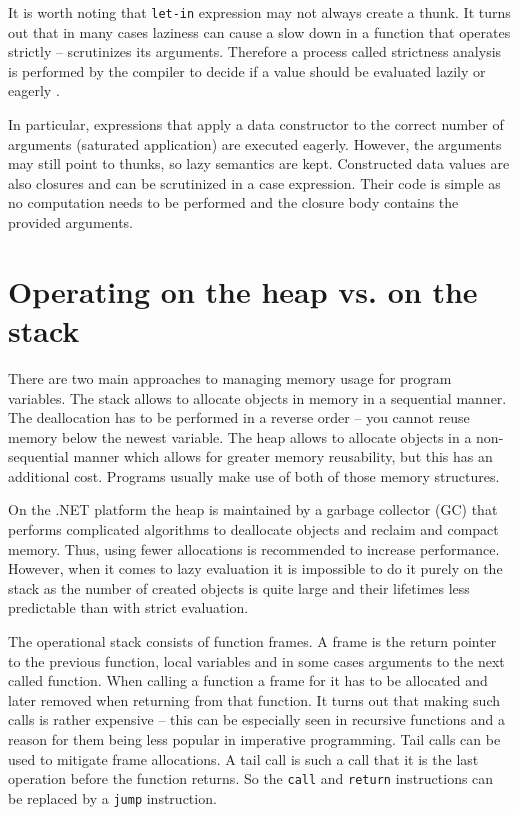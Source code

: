 \documentclass[en]{pracamgr}
\begin{document}
It is worth noting that \texttt{let-in} expression may not always create a thunk.
It turns out that in many cases laziness can cause a slow down in a function
that operates strictly -- scrutinizes its arguments. Therefore a process 
called strictness analysis is
performed by the compiler to decide if a value should be evaluated lazily or
eagerly \cite{demand analysis}.

In particular, expressions that apply a data constructor to the correct number
of arguments (saturated application) are executed eagerly. However, the
arguments may still point to thunks, so lazy semantics are kept.
Constructed data values are also closures and can be scrutinized
in a case expression. Their code is simple as no computation needs to be
performed and the closure body contains the provided arguments.

\section{Operating on the heap vs. on the stack}

There are two main approaches to managing memory usage for program variables.
The stack allows to allocate objects in memory in a sequential manner.
The deallocation has to be performed in a reverse order -- you cannot
reuse memory below the newest variable.
The heap allows to allocate objects in a non-sequential manner which allows
for greater memory reusability, but this has an additional cost.
Programs usually make use of both of those memory structures.

On the .NET platform the heap is maintained by a garbage collector (GC)
that performs complicated algorithms to deallocate objects and
reclaim and compact memory. Thus, using fewer allocations is recommended
to increase performance. However, when it comes to lazy evaluation it
is impossible to do it purely on the stack as the number of created objects
is quite large and their lifetimes less predictable than with strict evaluation.

The operational stack consists of function frames. A frame is the
return pointer to the previous function, local variables and in some cases
arguments to the next called function.
When calling a function a frame for it has to be allocated and later removed when
returning from that function.
It turns out that making such calls is rather expensive -- this can be especially seen
in recursive functions and a reason for them being less popular in 
imperative programming. Tail calls can be used to mitigate frame allocations.
A tail call is such a call that it is the last operation before the function returns.
So the \texttt{call} and \texttt{return} instructions
can be replaced by a \texttt{jump} instruction.
\end{document}
